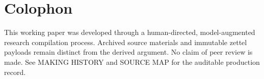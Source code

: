 \documentclass[11pt]{article}
\begin{document}
\section*{Colophon}
This working paper was developed through a human-directed, model-augmented research compilation process. Archived source materials and immutable zettel payloads remain distinct from the derived argument. No claim of peer review is made. See MAKING HISTORY and SOURCE MAP for the auditable production record.

\begin{flushright}
\end{flushright}
\end{document}
